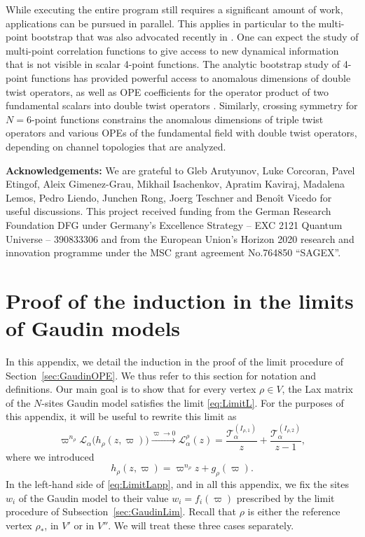 \documentclass{article}
\def\Lc{\mathcal{L}}
\begin{document}
While executing the entire program still requires a significant amount of work, applications 
can be pursued in parallel. This applies in particular to the multi-point bootstrap that was also advocated recently in \cite{Vieira:2020xfx}. One can expect the study of 
multi-point correlation functions to give access to new dynamical information that is not 
visible in scalar 4-point functions. The analytic bootstrap study of 4-point functions has 
provided powerful access to anomalous dimensions of double twist operators, as well as OPE 
coefficients for the operator product of two fundamental scalars into double twist operators \cite{Alday:2015eya,Alday:2016njk}. Similarly, crossing symmetry for $N=6$-point functions 
constrains the anomalous dimensions of triple twist operators and various OPEs of the 
fundamental field with double twist operators, depending on channel topologies that 
are analyzed. 
\bigskip 



\noindent 
\textbf{Acknowledgements:} We are grateful to Gleb Arutyunov, Luke Corcoran, Pavel Etingof, Aleix Gimenez-Grau, 
Mikhail Isachenkov, Apratim Kaviraj, Madalena Lemos, Pedro Liendo, Junchen Rong, Joerg Teschner 
and Benoît Vicedo for useful discussions. This project received funding from the German Research 
Foundation DFG under Germany’s Excellence Strategy -- EXC 2121 Quantum Universe -- 390833306 and 
from the European Union’s Horizon 2020 research and innovation programme under the MSC grant 
agreement No.764850 “SAGEX”.

\appendix

\section{Proof of the induction in the limits of Gaudin models}
\label{app:ProofRec}

In this appendix, we detail the induction in the proof of the limit procedure of Section~\ref{sec:GaudinOPE}. We thus refer to this section for notation and definitions. Our main goal is to show that for every vertex $\rho\in V$, the Lax matrix of the $N$-sites Gaudin model satisfies the limit \eqref{eq:LimitL}. For the purposes of this appendix, it will be useful to rewrite this limit as
\begin{equation}\label{eq:LimitLapp}
\varpi^{n_\rho} \Lc_\alpha \bigl( h_\rho(z,\varpi) \bigr) \xrightarrow{\varpi \to 0} \Lc_\alpha^\rho(z) = \frac{\mathcal{T}_\alpha^{(I_{\rho,1})}}{z} + \frac{\mathcal{T}_\alpha^{(I_{\rho,2})}}{z-1},
\end{equation}
where we introduced
\begin{equation}
h_\rho(z,\varpi) = \varpi^{n_\rho}z + g_\rho(\varpi).
\end{equation}
In the left-hand side of \eqref{eq:LimitLapp}, and in all this appendix, we fix the sites $w_i$ of the Gaudin model to their value $w_i=f_i(\varpi)$ prescribed by the limit procedure of Subsection~\ref{sec:GaudinLim}. Recall that $\rho$ is either the reference vertex $\rho_\ast$, in $V'$ or in $V''$. We will treat these three cases separately.
\end{document}
